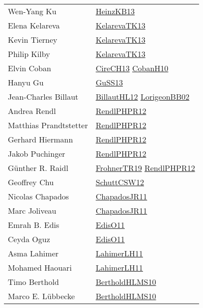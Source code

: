 {\begin{longtable}{p{4cm}p{15cm}}
Wen{-}Yang Ku & \href{papers/HeinzKB13.pdf}{HeinzKB13}\cite{HeinzKB13} \\
Elena Kelareva & \href{papers/KelarevaTK13.pdf}{KelarevaTK13}\cite{KelarevaTK13} \\
Kevin Tierney & \href{papers/KelarevaTK13.pdf}{KelarevaTK13}\cite{KelarevaTK13} \\
Philip Kilby & \href{papers/KelarevaTK13.pdf}{KelarevaTK13}\cite{KelarevaTK13} \\
Elvin Coban & \href{papers/CireCH13.pdf}{CireCH13}\cite{CireCH13} \href{papers/CobanH10.pdf}{CobanH10}\cite{CobanH10} \\
Hanyu Gu & \href{papers/GuSS13.pdf}{GuSS13}\cite{GuSS13} \\
Jean{-}Charles Billaut & \href{papers/BillautHL12.pdf}{BillautHL12}\cite{BillautHL12} \href{articles/LorigeonBB02.pdf}{LorigeonBB02}\cite{LorigeonBB02} \\
Andrea Rendl & \href{papers/RendlPHPR12.pdf}{RendlPHPR12}\cite{RendlPHPR12} \\
Matthias Prandtstetter & \href{papers/RendlPHPR12.pdf}{RendlPHPR12}\cite{RendlPHPR12} \\
Gerhard Hiermann & \href{papers/RendlPHPR12.pdf}{RendlPHPR12}\cite{RendlPHPR12} \\
Jakob Puchinger & \href{papers/RendlPHPR12.pdf}{RendlPHPR12}\cite{RendlPHPR12} \\
G{\"{u}}nther R. Raidl & \href{papers/FrohnerTR19.pdf}{FrohnerTR19}\cite{FrohnerTR19} \href{papers/RendlPHPR12.pdf}{RendlPHPR12}\cite{RendlPHPR12} \\
Geoffrey Chu & \href{papers/SchuttCSW12.pdf}{SchuttCSW12}\cite{SchuttCSW12} \\
Nicolas Chapados & \href{papers/ChapadosJR11.pdf}{ChapadosJR11}\cite{ChapadosJR11} \\
Marc Joliveau & \href{papers/ChapadosJR11.pdf}{ChapadosJR11}\cite{ChapadosJR11} \\
Emrah B. Edis & \href{papers/EdisO11.pdf}{EdisO11}\cite{EdisO11} \\
Ceyda Oguz & \href{papers/EdisO11.pdf}{EdisO11}\cite{EdisO11} \\
Asma Lahimer & \href{papers/LahimerLH11.pdf}{LahimerLH11}\cite{LahimerLH11} \\
Mohamed Haouari & \href{papers/LahimerLH11.pdf}{LahimerLH11}\cite{LahimerLH11} \\
Timo Berthold & \href{papers/BertholdHLMS10.pdf}{BertholdHLMS10}\cite{BertholdHLMS10} \\
Marco E. L{\"{u}}bbecke & \href{papers/BertholdHLMS10.pdf}{BertholdHLMS10}\cite{BertholdHLMS10} \\

\end{longtable}}

